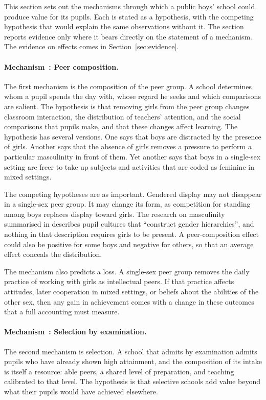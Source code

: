 \documentclass[11pt]{article}
\newcommand{\srcq}[2]{``#2''}
\newcounter{mech}
\newcommand{\mech}[1]{\refstepcounter{mech}\paragraph{Mechanism~\themech: #1.}}
\begin{document}
This section sets out the mechanisms through which a public boys' school could produce value for its pupils. Each is stated as a hypothesis, with the competing hypothesis that would explain the same observations without it. The section reports evidence only where it bears directly on the statement of a mechanism. The evidence on effects comes in Section~\ref{sec:evidence}.

\mech{Peer composition}\label{mech:peers}
The first mechanism is the composition of the peer group. A school determines whom a pupil spends the day with, whose regard he seeks and which comparisons are salient. The hypothesis is that removing girls from the peer group changes classroom interaction, the distribution of teachers' attention, and the social comparisons that pupils make, and that these changes affect learning. The hypothesis has several versions. One says that boys are distracted by the presence of girls. Another says that the absence of girls removes a pressure to perform a particular masculinity in front of them. Yet another says that boys in a single-sex setting are freer to take up subjects and activities that are coded as feminine in mixed settings.

The competing hypotheses are as important. Gendered display may not disappear in a single-sex peer group. It may change its form, as competition for standing among boys replaces display toward girls. The research on masculinity summarised in \citet{connell1996} describes pupil cultures that \srcq{connell1996}{construct gender hierarchies}, and nothing in that description requires girls to be present. A peer-composition effect could also be positive for some boys and negative for others, so that an average effect conceals the distribution.

The mechanism also predicts a loss. A single-sex peer group removes the daily practice of working with girls as intellectual peers. If that practice affects attitudes, later cooperation in mixed settings, or beliefs about the abilities of the other sex, then any gain in achievement comes with a change in these outcomes that a full accounting must measure.

\mech{Selection by examination}\label{mech:selection}
The second mechanism is selection. A school that admits by examination admits pupils who have already shown high attainment, and the composition of its intake is itself a resource: able peers, a shared level of preparation, and teaching calibrated to that level. The hypothesis is that selective schools add value beyond what their pupils would have achieved elsewhere.
\end{document}
